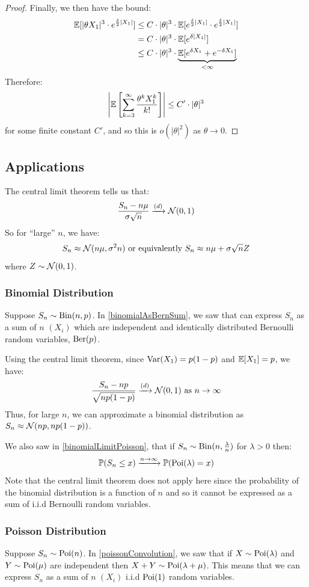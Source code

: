 \documentclass[../main.tex]{subfiles}
\begin{document}
\begin{proof}
  Finally, we then have the bound:
  \begin{align*}
    \mathbb{E}[|\theta X_1|^3 \cdot e^{\frac{\delta}{2}|X_1|}] &\leq C \cdot |\theta|^3 \cdot \mathbb{E}[e^{\frac{\delta}{2}|X_1|} \cdot e^{\frac{\delta}{2}|X_1|}] \\
                                                       &= C \cdot |\theta|^3 \cdot \mathbb{E}[e^{\delta|X_1|}] \\
                                                       &\leq C \cdot |\theta|^3 \cdot \underbrace{\mathbb{E}[e^{\delta X_1} + e^{-\delta X_1}]}_{< \infty}
  \end{align*}
  Therefore:
  \[
    \left\lvert \mathbb{E}\left[\sum_{k = 3}^{\infty} \frac{\theta^{k}X^{k}_1}{k!}\right] \right\rvert \leq C' \cdot |\theta|^3
  \]
  for some finite constant $C'$, and so this is $o(|\theta|^2)$ as $\theta \to 0$.
\end{proof}
\subsection{Applications}
The central limit theorem tells us that:
\[
  \frac{S_n - n\mu}{\sigma \sqrt{n}} \xrightarrow{(d)} \operatorname{\mathcal{N}}(0, 1)
\]
So for ``large'' $n$, we have:
\[
  S_n \approx \operatorname{\mathcal{N}}(n\mu, \sigma^2n) \text{ or equivalently } S_n \approx n\mu + \sigma\sqrt{n} Z
\]
where $Z \sim \operatorname{\mathcal{N}}(0, 1)$.
\subsubsection{Binomial Distribution}
Suppose $S_n \sim \operatorname{Bin}(n, p)$.
In \cref{binomialAsBernSum}, we saw that can express $S_n$ as a sum of $n$ $(X_i)$ which are independent and identically distributed Bernoulli random variables, $\operatorname{Ber}(p)$.

Using the central limit theorem, since $\operatorname{Var}(X_1) = p(1 - p)$ and $\mathbb{E}[X_1] = p$, we have:
\[
  \frac{S_n - np}{\sqrt{np(1 - p)}} \xrightarrow{(d)} \operatorname{\mathcal{N}}(0, 1) \text{ as } n \to \infty
\]
Thus, for large $n$, we can approximate a binomial distribution as $S_n \approx \operatorname{\mathcal{N}}(np, np(1 - p))$.

We also saw in \cref{binomialLimitPoisson}, that if $S_n \sim \operatorname{Bin}(n, \frac{\lambda}{n})$ for $\lambda > 0$ then:
\[
  \mathbb{P}(S_n \leq x) \xrightarrow{n \to \infty} \mathbb{P}(\operatorname{Poi}(\lambda) = x)
\]
Note that the central limit theorem does not apply here since the probability of the binomial distribution is a function of $n$ and so it cannot be expressed as a sum of i.i.d Bernoulli random variables.
\subsubsection{Poisson Distribution}
Suppose $S_n \sim \operatorname{Poi}(n)$.
In \cref{poissonConvolution}, we saw that if $X \sim \operatorname{Poi}(\lambda)$ and $Y \sim \operatorname{Poi}(\mu)$ are independent then $X + Y \sim \operatorname{Poi}(\lambda + \mu)$.
This means that we can express $S_n$ as a sum of $n$ $(X_i)$ i.i.d $\operatorname{Poi}(1)$ random variables.
\end{document}
